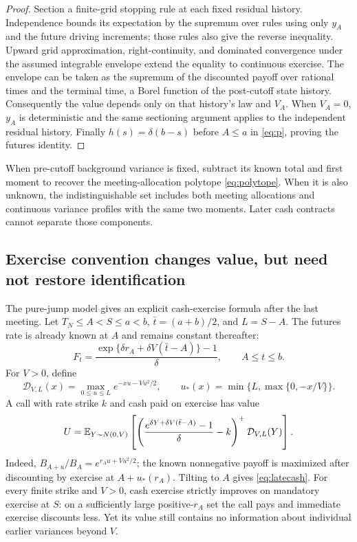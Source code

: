 \begin{proof}
Section a finite-grid stopping rule at each fixed residual history. Independence bounds its expectation by the supremum over rules using only $y_A$ and the future driving increments; those rules also give the reverse inequality. Upward grid approximation, right-continuity, and dominated convergence under the assumed integrable envelope extend the equality to continuous exercise. The envelope can be taken as the supremum of the discounted payoff over rational times and the terminal time, a Borel function of the post-cutoff state history. Consequently the value depends only on that history's law and $V_A$. When $V_A=0$, $y_A$ is deterministic and the same sectioning argument applies to the independent residual history. Finally $h(s)=\delta(b-s)$ before $A\leq a$ in \eqref{eq:p}, proving the futures identity.
\end{proof}
When pre-cutoff background variance is fixed, subtract its known total and first moment to recover the meeting-allocation polytope \eqref{eq:polytope}. When it is also unknown, the indistinguishable set includes both meeting allocations and continuous variance profiles with the same two moments. Later cash contracts cannot separate those components.

\subsection{Exercise convention changes value, but need not restore identification}
The pure-jump model gives an explicit cash-exercise formula after the last meeting. Let $T_N\leq A<S\leq a<b$, $\bar t=(a+b)/2$, and $L=S-A$. The futures rate is already known at $A$ and remains constant thereafter:
\[
F_t=\frac{\exp\{\delta r_A+\delta V(\bar t-A)\}-1}{\delta},
\qquad A\leq t\leq b.
\]
For $V>0$, define
\[
\mathcal D_{V,L}(x)=\max_{0\leq u\leq L}e^{-xu-Vu^2/2},\qquad
u_*(x)=\min\{L,\max\{0,-x/V\}\}.
\]
A call with rate strike $k$ and cash paid on exercise has value
\begin{equation}\label{eq:latecash}
U=\mathbb E_{Y\sim N(0,V)}
 \left[\left(\frac{e^{\delta Y+\delta V(\bar t-A)}-1}{\delta}-k\right)^+
                         \mathcal D_{V,L}(Y)\right].
\end{equation}
Indeed, $B_{A+u}/B_A=e^{r_Au+Vu^2/2}$; the known nonnegative payoff is maximized after discounting by exercise at $A+u_*(r_A)$. Tilting to $A$ gives \eqref{eq:latecash}. For every finite strike and $V>0$, cash exercise strictly improves on mandatory exercise at $S$: on a sufficiently large positive-$r_A$ set the call pays and immediate exercise discounts less. Yet its value still contains no information about individual earlier variances beyond $V$.

